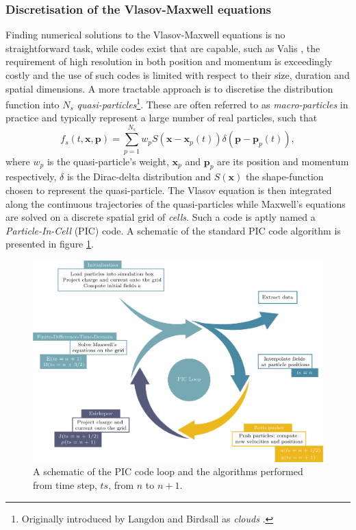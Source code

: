 \subsubsection{Discretisation of the Vlasov-Maxwell equations}
Finding numerical solutions to the Vlasov-Maxwell equations is no straightforward task, while codes exist that are capable, such as Valis \cite{sircombeVALISSplitconservativeScheme2009}, the requirement of high resolution in both position and momentum is exceedingly costly and the use of such codes is limited with respect to their size, duration and spatial dimensions. A more tractable approach is to discretise the distribution function into $N_s$ \textit{quasi-particles}\footnote{Originally introduced by Langdon and Birdsall as \textit{clouds} \cite{langdonTheoryPlasmaSimulation1970}.}. These are often referred to as \textit{macro-particles} in practice and typically represent a large number of real particles, such that
\begin{equation}
	f_s(t,\mathbf{x},\mathbf{p}) = \sum^{N_s}_{p=1} w_p S(\mathbf{x}-\mathbf{x}_p(t))\delta (\mathbf{p}-\mathbf{p}_p(t)),
\end{equation}
where $w_p$ is the quasi-particle's weight, $\mathbf{x}_p$ and $\mathbf{p}_p$ are its position and momentum respectively, $\delta$ is the Dirac-delta distribution and $S(\mathbf{x})$ the shape-function chosen to represent the quasi-particle. The Vlasov equation is then integrated along the continuous trajectories of the quasi-particles while Maxwell's equations are solved on a discrete spatial grid of \textit{cells}. Such a code is aptly named a\textit{ Particle-In-Cell} (PIC) code. A schematic of the standard PIC code algorithm is presented in figure \ref{fig:intropiccycle-01}. 
\begin{figure}
	\centering
	\includegraphics[width=\linewidth]{figures/intro/intro_PIC_cycle}
	\caption[A schematic of the PIC code loop and the algorithms performed.]{A schematic of the PIC code loop and the algorithms performed from time step, $ts$, from $n$ to $n+1$.}
	\label{fig:intropiccycle-01}
\end{figure}
